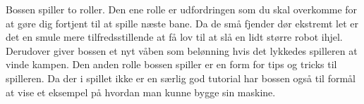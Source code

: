 Bossen spiller to roller. Den ene rolle er udfordringen som du skal overkomme for at gøre dig fortjent til at spille næste bane. Da de små fjender dør ekstremt let er det en smule mere tilfredsstillende at få lov til at slå en lidt større robot ihjel. Derudover giver bossen et nyt våben som belønning hvis det lykkedes spilleren at vinde kampen.
Den anden rolle bossen spiller er en form for tips og tricks til spilleren. Da der i spillet ikke er en særlig god tutorial har bossen også til formål at vise et eksempel på hvordan man kunne bygge sin maskine.


